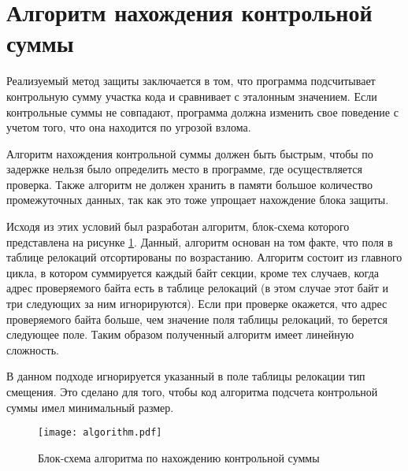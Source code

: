 
\section{Алгоритм нахождения контрольной суммы}

Реализуемый метод защиты заключается в том, что программа подсчитывает
контрольную сумму участка кода и сравнивает с эталонным значением. Если
контрольные суммы не совпадают, программа должна изменить свое поведение с
учетом того, что она находится по угрозой взлома.

Алгоритм нахождения контрольной суммы должен быть быстрым, чтобы по задержке
нельзя было определить место в программе, где осуществляется проверка. Также
алгоритм не должен хранить в памяти большое количество промежуточных данных, так
как это тоже упрощает нахождение блока защиты.

Исходя из этих условий был разработан алгоритм, блок-схема которого представлена
на рисунке \ref{fig:algorithm}. Данный, алгоритм основан на том факте, что поля
в таблице релокаций отсортированы по возрастанию. Алгоритм состоит из главного
цикла, в котором суммируется каждый байт секции, кроме тех случаев, когда адрес
проверяемого байта есть в таблице релокаций (в этом случае этот байт и три
следующих за ним игнорируются). Если при проверке окажется, что адрес
проверяемого байта больше, чем значение поля таблицы релокаций, то берется
следующее поле. Таким образом полученный алгоритм имеет линейную сложность.

В данном подходе игнорируется указанный в поле таблицы релокации тип смещения.
Это сделано для того, чтобы код алгоритма подсчета контрольной суммы имел
минимальный размер. 


\begin{figure}[h!]
  \centering
  \texttt{[image: algorithm.pdf]}
  \caption{Блок-схема алгоритма по нахождению контрольной суммы}
  \label{fig:algorithm}
\end{figure}

\clearpage
